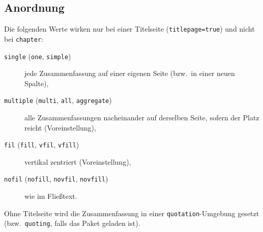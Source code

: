 \documentclass[
  logo={
    color=blue,
    language=de,
    colormodel=rgb
  },
  fontsize=11tudpt,
  usemargin,
  oneside
]{tudcdreprt}
\begin{document}

\subsection{Anordnung}
Die folgenden Werte wirken nur bei einer Titelseite (\texttt{titlepage=true}) und nicht bei \texttt{chapter}:
\begin{description}
  \item[\texttt{single} (\texttt{one}, \texttt{simple})] jede Zusammenfassung auf einer eigenen Seite
    (bzw.\ in einer neuen Spalte),
  \item[\texttt{multiple} (\texttt{multi}, \texttt{all}, \texttt{aggregate})] alle Zusammenfassungen nacheinander
    auf derselben Seite, sofern der Platz reicht (Voreinstellung),
  \item[\texttt{fil} (\texttt{fill}, \texttt{vfil}, \texttt{vfill})] vertikal zentriert (Voreinstellung),
  \item[\texttt{nofil} (\texttt{nofill}, \texttt{novfil}, \texttt{novfill})] wie im Fließtext.
\end{description}
Ohne Titelseite wird die Zusammenfassung in einer \texttt{quotation}-Umgebung gesetzt (bzw.\ \texttt{quoting},
falls das Paket geladen ist).
\end{document}
